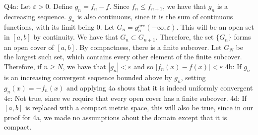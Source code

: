 \documentclass[letterpaper]{article}
\begin{document}
\noindent Q4a: Let $\varepsilon>0$. Define $g_n = f_n-f$. Since $f_n \leq f_{n+1}$, we have that $g_n$ is a decreasing sequence. $g_n$ is also continuous, since it is the sum of continuous functions, with its limit being 0. Let $G_n = g_n^{pre}(-\infty,\varepsilon)$. This will be an open set in $[a,b]$ by continuity. We have that $G_n \subset G_{n+1}$. Therefore, the set $\{G_n\}$ forms an open cover of $[a,b]$. By compactness, there is a finite subcover. Let $G_N$ be the largest such set, which contains every other element of the finite subcover. Therefore, if $n\geq N $, we have that $|g_n|<\varepsilon$ and so $|f_n(x)-f(x)|<\varepsilon$
\newline 4b: If $g_n$ is an increasing convergent sequence bounded above by $g_n$, setting $g_n(x) = -f_n(x)$ and applying 4a shows that it is indeed uniformly convergent
\newline 4c: Not true, since we require that every open cover has a finite subcover. 
\newline 4d: If $[a,b] $ is replaced with a compact metric space, this will also be true, since in our proof for 4a, we made no assumptions about the domain except that it is compact. 
\end{document}
